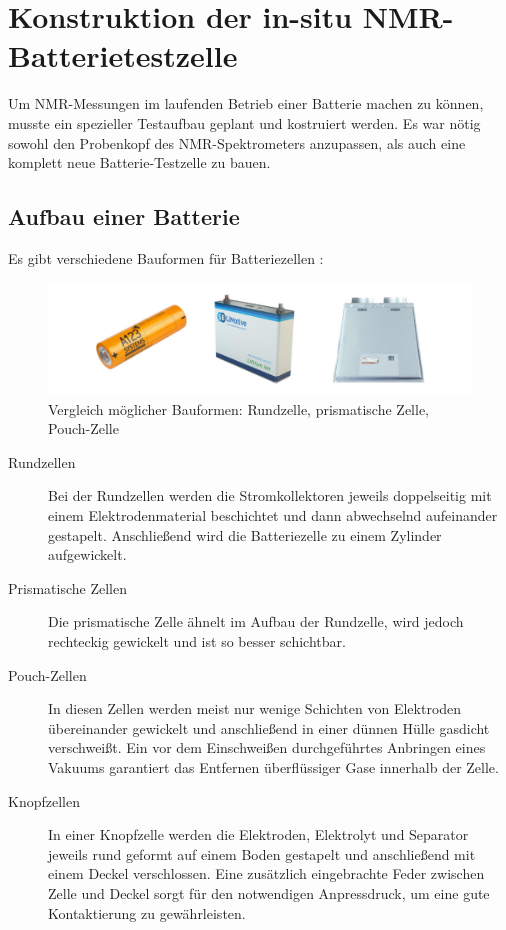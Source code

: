 \documentclass[a4paper, 11pt, headsepline,footsepline,twoside,abstract]{scrbook}
\begin{document}
\chapter{Konstruktion der in-situ NMR-Batterietestzelle}
Um NMR-Messungen im laufenden Betrieb einer Batterie machen zu können, musste ein spezieller Testaufbau geplant und kostruiert werden. Es war nötig sowohl den Probenkopf des NMR-Spektrometers anzupassen, als auch eine komplett neue Batterie-Testzelle zu bauen.
\section{Aufbau einer Batterie}
Es gibt verschiedene Bauformen für Batteriezellen \cite{Linden2011}:
\begin{figure}
	\centering
	\includegraphics[width=1.0\columnwidth]{images/rund_prisma_pouch.jpg}
	\caption{Vergleich möglicher Bauformen: Rundzelle, prismatische Zelle, Pouch-Zelle \cite{bub_skript}}
	\label{vergleich_zellform}
\end{figure}
\begin{description}
\item[Rundzellen] Bei der Rundzellen werden die Stromkollektoren jeweils doppelseitig mit einem Elektrodenmaterial beschichtet und dann abwechselnd aufeinander gestapelt. Anschließend wird die Batteriezelle zu einem Zylinder aufgewickelt.
\item[Prismatische Zellen] Die prismatische Zelle ähnelt im Aufbau der Rundzelle, wird jedoch rechteckig gewickelt und ist so besser schichtbar.
\item[Pouch-Zellen] In diesen Zellen werden meist nur wenige Schichten von Elektroden übereinander gewickelt und anschließend in einer dünnen Hülle gasdicht verschweißt. Ein vor dem Einschweißen durchgeführtes Anbringen eines Vakuums garantiert das Entfernen überflüssiger Gase innerhalb der Zelle.
\item[Knopfzellen] In einer Knopfzelle werden die Elektroden, Elektrolyt und Separator jeweils rund geformt auf einem Boden gestapelt und anschließend mit einem Deckel verschlossen. Eine zusätzlich eingebrachte Feder zwischen Zelle und Deckel sorgt für den notwendigen Anpressdruck, um eine gute Kontaktierung zu gewährleisten.
\end{description}
\end{document}
